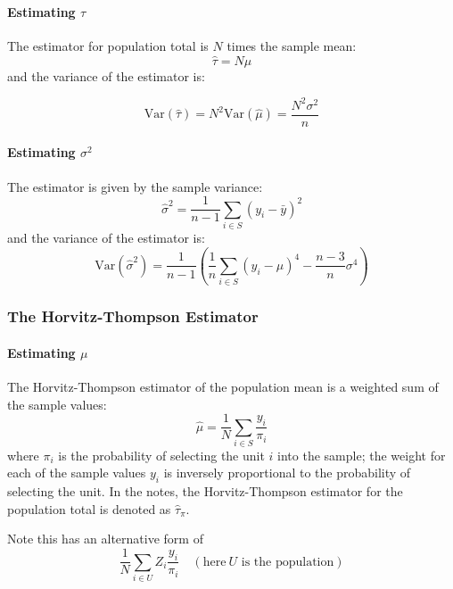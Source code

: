 \documentclass{article}
\begin{document}
\paragraph{Estimating $\tau$} The estimator for population total is $N$ times the sample mean:
\begin{equation}
    \hat{\tau} = N\hat{\mu}
\end{equation}
and the variance of the estimator is:

\begin{equation}
    \mathrm{Var}(\hat{\tau}) = N^2\mathrm{Var}(\hat{\mu}) = \frac{N^2\sigma^2}{n}
\end{equation}

\paragraph{Estimating $\sigma^2$} The estimator is given by the sample variance:
\begin{equation}
    \hat{\sigma}^2 = \frac{1}{n-1}\sum_{i\in S} (y_i-\bar{y})^2
\end{equation}
and the variance of the estimator is:
\begin{equation}
    \mathrm{Var}(\hat{\sigma}^2) = \frac{1}{n-1}\left(\frac{1}{n}\sum_{i\in S} (y_i-\mu)^4 - \frac{n-3}{n}\sigma^4\right)
\end{equation}


\subsubsection{The Horvitz-Thompson Estimator}
\paragraph{Estimating $\mu$} The Horvitz-Thompson estimator of the population mean is a weighted sum of the sample values:
\begin{equation}
    \hat{\mu} = \frac{1}{N}\sum_{i\in S} \frac{y_i}{\pi_i}
\end{equation}
where $\pi_i$ is the probability of selecting the unit $i$ into the sample; the weight for each of the sample values $y_i$ is inversely proportional to the probability of selecting the unit. In the notes, the Horvitz-Thompson estimator for the population total is denoted as $\hat{\tau}_{\pi}$.

Note this has an alternative form of 
\[
    \frac{1}{N}\sum_{i\in U} Z_i\frac{y_i}{\pi_i} \quad (\text{here} \ U \text{ is the population})
\]
\end{document}
